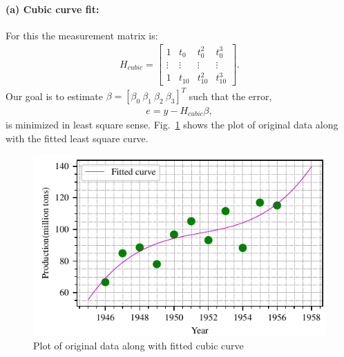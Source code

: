 \paragraph{(a) Cubic curve fit:}For this the measurement matrix is:
\begin{align*}
H_{cubic} = \begin{bmatrix}1 & t_0 & t_0^2 & t_0^3\\ \vdots & \vdots & \vdots & \vdots\\1 & t_{10} & t_{10}^2 & t_{10}^3\end{bmatrix}.
\end{align*}
Our goal is to estimate $\beta = [\beta_0\ \beta_1\ \beta_2\ \beta_3]^T$ such that the error,
\begin{align*}
e = y - H_{cubic}\beta,
\end{align*}
is minimized in least square sense. Fig.~\ref{fig:fit_cubic} shows the plot of original data along with the fitted least square curve.
\begin{figure}[h]
	\centering
	\includegraphics[scale=1.0,trim={0cm 0cm 0cm 0cm},clip]{./code/generatedPlots/fit_cubic.pdf}
	\caption{Plot of original data along with fitted cubic curve}
	\label{fig:fit_cubic}
\end{figure}
